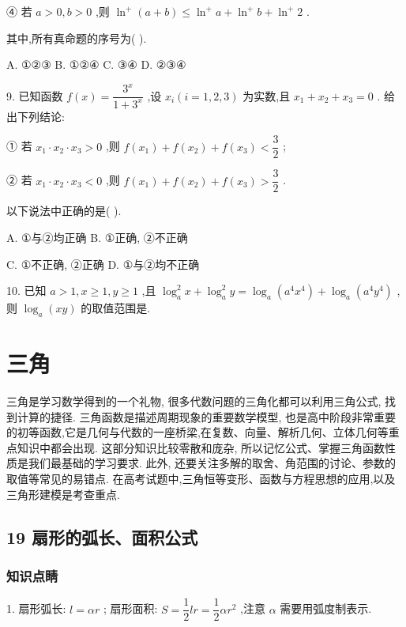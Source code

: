 ④ 若 $a > 0,b > 0$ ,则 ${\ln }^{ + }\left( {a + b}\right)  \leq  {\ln }^{ + }a + {\ln }^{ + }b + {\ln }^{ + }2$ .

其中,所有真命题的序号为(   ).

A. ①②③ B. ①②④ C. ③④ D. ②③④

9. 已知函数 $f\left( x\right)  = \dfrac{{3}^{x}}{1 + {3}^{x}}$ ,设 ${x}_{i}\left( {i = 1,2,3}\right)$ 为实数,且 ${x}_{1} + {x}_{2} + {x}_{3} = 0$ . 给出下列结论:

① 若 ${x}_{1} \cdot  {x}_{2} \cdot  {x}_{3} > 0$ ,则 $f\left( {x}_{1}\right)  + f\left( {x}_{2}\right)  + f\left( {x}_{3}\right)  < \dfrac{3}{2}$ ;

② 若 ${x}_{1} \cdot  {x}_{2} \cdot  {x}_{3} < 0$ ,则 $f\left( {x}_{1}\right)  + f\left( {x}_{2}\right)  + f\left( {x}_{3}\right)  > \dfrac{3}{2}$ .

以下说法中正确的是(   ).

A. ①与②均正确 B. ①正确, ②不正确

C. ①不正确, ②正确 D. ①与②均不正确

10. 已知 $a > 1,x \geq  1,y \geq  1$ ,且 ${\log }_{a}^{2}x + {\log }_{a}^{2}y = {\log }_{a}\left( {{a}^{4}{x}^{4}}\right)  + {\log }_{a}\left( {{a}^{4}{y}^{4}}\right)$ ,则 ${\log }_{a}\left( {xy}\right)$ 的取值范围是\blkda{}.

\section*{三角}

三角是学习数学得到的一个礼物, 很多代数问题的三角化都可以利用三角公式, 找到计算的捷径. 三角函数是描述周期现象的重要数学模型, 也是高中阶段非常重要的初等函数,它是几何与代数的一座桥梁,在复数、向量、解析几何、立体几何等重点知识中都会出现. 这部分知识比较零散和庞杂, 所以记忆公式、掌握三角函数性质是我们最基础的学习要求. 此外, 还要关注多解的取舍、角范围的讨论、参数的取值等常见的易错点. 在高考试题中,三角恒等变形、函数与方程思想的应用,以及三角形建模是考查重点.

\subsection*{19 扇形的弧长、面积公式}

\subsubsection*{知识点睛}

1. 扇形弧长: $l = {\alpha r}$ ; 扇形面积: $S = \dfrac{1}{2}{lr} = \dfrac{1}{2}\alpha {r}^{2}$ ,注意 $\alpha$ 需要用弧度制表示.

